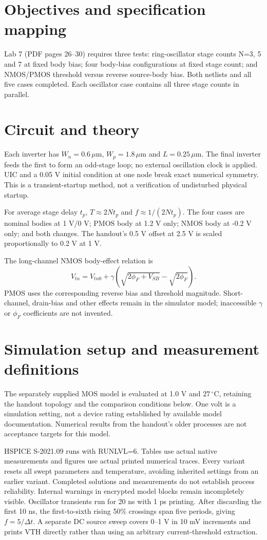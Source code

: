 \section{Objectives and specification mapping}
Lab 7 (PDF pages 26--30) requires three tests: ring-oscillator stage counts N=3, 5 and 7 at fixed body bias; four body-bias configurations at fixed stage count; and NMOS/PMOS threshold versus reverse source-body bias. Both netlists and all five cases completed. Each oscillator case contains all three stage counts in parallel.

\section{Circuit and theory}
Each inverter has $W_n=0.6\,\mu$m, $W_p=1.8\,\mu$m and $L=0.25\,\mu$m. The final inverter feeds the first to form an odd-stage loop; no external oscillation clock is applied. UIC and a 0.05 V initial condition at one node break exact numerical symmetry. This is a transient-startup method, not a verification of undisturbed physical startup.

For average stage delay $t_p$, $T\approx2Nt_p$ and $f\approx1/(2Nt_p)$. The four cases are nominal bodies at 1 V/0 V; PMOS body at 1.2 V only; NMOS body at -0.2 V only; and both changes. The handout's 0.5 V offset at 2.5 V is scaled proportionally to 0.2 V at 1 V.

The long-channel NMOS body-effect relation is
\[V_{tn}=V_{tn0}+\gamma\left(\sqrt{2\phi_F+V_{SB}}-\sqrt{2\phi_F}\right).\]
PMOS uses the corresponding reverse bias and threshold magnitude. Short-channel, drain-bias and other effects remain in the simulator model; inaccessible $\gamma$ or $\phi_F$ coefficients are not invented.

\section{Simulation setup and measurement definitions}
The separately supplied MOS model is evaluated at 1.0 V and $27\,^{\circ}$C, retaining the handout topology and the comparison conditions below. One volt is a simulation setting, not a device rating established by available model documentation. Numerical results from the handout's older processes are not acceptance targets for this model.

HSPICE S-2021.09 runs with RUNLVL=6. Tables use actual native measurements and figures use actual printed numerical traces. Every variant resets all swept parameters and temperature, avoiding inherited settings from an earlier variant. Completed solutions and measurements do not establish process reliability. Internal warnings in encrypted model blocks remain incompletely visible.
Oscillator transients run for 20 ns with 1 ps printing. After discarding the first 10 ns, the first-to-sixth rising 50\% crossings span five periods, giving $f=5/\Delta t$. A separate DC source sweep covers 0--1 V in 10 mV increments and prints VTH directly rather than using an arbitrary current-threshold extraction.

